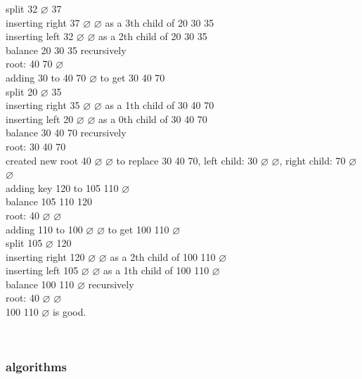 \documentclass[a4paper,12pt]{article}
\begin{document}
split 32 \(\varnothing\) 37\\[0pt]
inserting right 37 \(\varnothing\) \(\varnothing\) as a 3th child of 20 30 35\\[0pt]
inserting left 32 \(\varnothing\) \(\varnothing\) as a 2th child of 20 30 35\\[0pt]
balance 20 30 35 recursively\\[0pt]
root: 40 70 \(\varnothing\)\\[0pt]
adding 30 to 40 70 \(\varnothing\) to get 30 40 70\\[0pt]
split 20 \(\varnothing\) 35\\[0pt]
inserting right 35 \(\varnothing\) \(\varnothing\) as a 1th child of 30 40 70\\[0pt]
inserting left 20 \(\varnothing\) \(\varnothing\) as a 0th child of 30 40 70\\[0pt]
balance 30 40 70 recursively\\[0pt]
root: 30 40 70\\[0pt]
created new root 40 \(\varnothing\) \(\varnothing\) to replace 30 40 70, left child: 30 \(\varnothing\) \(\varnothing\), right child: 70 \(\varnothing\) \(\varnothing\)\\[0pt]
adding key 120 to 105 110 \(\varnothing\)\\[0pt]
balance 105 110 120\\[0pt]
root: 40 \(\varnothing\) \(\varnothing\)\\[0pt]
adding 110 to 100 \(\varnothing\) \(\varnothing\) to get 100 110 \(\varnothing\)\\[0pt]
split 105 \(\varnothing\) 120\\[0pt]
inserting right 120 \(\varnothing\) \(\varnothing\) as a 2th child of 100 110 \(\varnothing\)\\[0pt]
inserting left 105 \(\varnothing\) \(\varnothing\) as a 1th child of 100 110 \(\varnothing\)\\[0pt]
balance 100 110 \(\varnothing\) recursively\\[0pt]
root: 40 \(\varnothing\) \(\varnothing\)\\[0pt]
100 110 \(\varnothing\) is good.\\[0pt]
\begin{center}

\end{center}\\[0pt]
\subsubsection{algorithms}
\label{sec:orgf60ac12}
\end{document}
